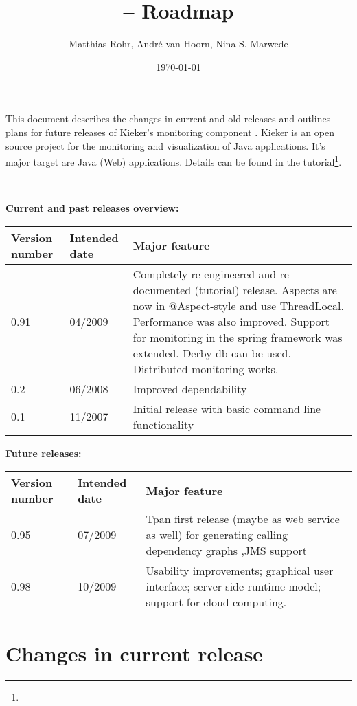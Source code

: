 \documentclass{scrartcl}
\title{\kieker -- Roadmap}
\date{\today \\ \kiekerurl{roadmap.pdf}}
\author{Matthias Rohr, Andr\'{e} van Hoorn, Nina S. Marwede}
\begin{document}
\maketitle
\noindent
This document describes the changes in current and old releases and outlines plans for future releases of Kieker's monitoring component \tpmon{}. Kieker is an open source project
for the monitoring and visualization of Java applications. It's major target are Java (Web) applications. Details can be found in the tutorial\footnote{\kiekertutorialurl}.

\

\noindent \large{\textbf{Current and past releases overview:}}
\begin{center}%
 \begin{tabular}{|l|l|p{8cm}|} \hline
\textbf{Version number} & \textbf{Intended date} & \textbf{Major feature} \\ \hline
0.91 & 04/2009 & Completely re-engineered and re-documented (tutorial) release. Aspects are now in @Aspect-style and use ThreadLocal. Performance was also improved. Support for monitoring in the spring framework was extended. Derby db can be used. Distributed monitoring works.\\ \hline
0.2 & 06/2008 & Improved dependability \\ \hline
0.1 & 11/2007 & Initial release with basic command line functionality \\ \hline
\end{tabular}
\end{center}

\noindent \large{\textbf{Future releases:}}
\begin{center}%
 \begin{tabular}{|l|l|p{8cm}|} \hline
\textbf{Version number} & \textbf{Intended date} & \textbf{Major feature} \\ \hline

0.95 & 07/2009 & Tpan first release (maybe as web service as well) for generating calling dependency graphs ,JMS support\\ \hline
0.98 & 10/2009 & Usability improvements; graphical user interface; server-side runtime model; support for cloud computing.\\ \hline
\end{tabular}
\end{center}


\section{Changes in current release}
\end{document}
